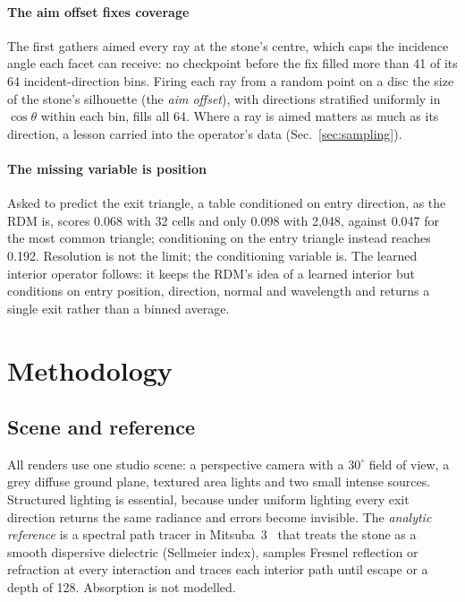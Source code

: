 \documentclass[conference]{IEEEtran}
\newcommand{\dg}{^{\circ}}
\begin{document}
\paragraph{The aim offset fixes coverage} The first gathers aimed every ray at
the stone's centre, which caps the incidence angle each facet can receive: no
checkpoint before the fix filled more than 41 of its 64 incident-direction bins.
Firing each ray from a random point on a disc the size of the stone's
silhouette (the \emph{aim offset}), with directions stratified uniformly in
$\cos\theta$ within each bin, fills all 64. Where a ray is aimed matters as much
as its direction, a lesson carried into the operator's data (Sec.~\ref{sec:sampling}).

\paragraph{The missing variable is position} Asked to predict the exit
triangle, a table conditioned on entry direction, as the RDM is, scores 0.068
with 32 cells and only 0.098 with 2,048, against 0.047 for the most common
triangle; conditioning on the entry triangle instead reaches 0.192. Resolution
is not the limit; the conditioning variable is. The learned interior operator
follows: it keeps the RDM's idea of a learned interior but conditions on entry
position, direction, normal and wavelength and returns a single exit rather
than a binned average.

\section{Methodology}
\label{sec:method}
\subsection{Scene and reference}
All renders use one studio scene: a perspective camera with a $30\dg$ field of
view, a grey diffuse ground plane, textured area lights and two small intense
sources. Structured lighting is essential, because under uniform lighting every
exit direction returns the same radiance and errors become invisible. The
\emph{analytic reference} is a spectral path tracer in Mitsuba~3~\cite{mitsuba3}
that treats the stone as a smooth dispersive dielectric (Sellmeier index),
samples Fresnel reflection or refraction at every interaction and traces each
interior path until escape or a depth of 128. Absorption is not modelled.
\end{document}
